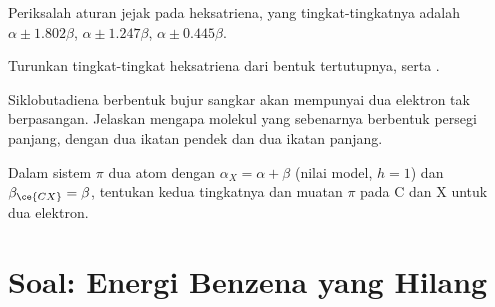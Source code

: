 \begin{exercise}[$\star\star$]\label{exo:b2:huckel:9}
Periksalah aturan jejak pada heksatriena, yang tingkat-tingkatnya adalah
$\alpha \pm 1.802\beta$, $\alpha \pm
1.247\beta$, $\alpha \pm 0.445\beta$.
\end{exercise}

\begin{exercise}[$\star\star\star$]\label{exo:b2:huckel:10}
Turunkan tingkat-tingkat heksatriena dari bentuk tertutupnya, serta .
\end{exercise}

\begin{exercise}[$\star\star\star$]\label{exo:b2:huckel:11}
Siklobutadiena berbentuk bujur sangkar akan mempunyai dua elektron tak
berpasangan. Jelaskan mengapa molekul yang sebenarnya berbentuk persegi
panjang, dengan dua ikatan pendek dan dua ikatan panjang.
\end{exercise}

\begin{exercise}[$\star\star\star$]\label{exo:b2:huckel:12}
Dalam sistem $\pi$ dua atom  dengan $\alpha_X = \alpha + \beta$ (nilai
model, $h = 1$) dan $\beta_{\ce{CX}} = \beta$, tentukan kedua tingkatnya dan
muatan $\pi$ pada C dan X untuk dua elektron.
\end{exercise}

\section{Soal: Energi Benzena yang Hilang}

